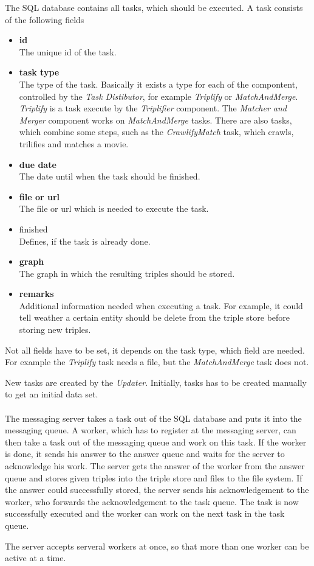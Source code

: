The SQL database contains all tasks, which should be executed.
A task consists of the following fields
\begin{itemize}
  \item \textbf{id} \\
  The unique id of the task.
  \item \textbf{task type} \\
  The type of the task.
  Basically it exists a type for each of the compontent, controlled by the \textit{Task Distibutor}, for example \textit{Triplify} or \textit{MatchAndMerge}.
  \textit{Triplify} is a task execute by the \textit{Triplifier} component.
  The \textit{Matcher and Merger} component works on \textit{MatchAndMerge} tasks.
  There are also tasks, which combine some steps, such as the \textit{CrawlifyMatch} task, which crawls, trilifies and matches a movie.
  \item \textbf{due date} \\
  The date until when the task should be finished.
  \item \textbf{file or url} \\
  The file or url which is needed to execute the task.
  \item finished \\
  Defines, if the task is already done.
  \item \textbf{graph} \\
  The graph in which the resulting triples should be stored.
  \item \textbf{remarks} \\
  Additional information needed when executing a task.
  For example, it could tell weather a certain entity should be delete from the triple store before storing new triples.
\end{itemize}
Not all fields have to be set, it depends on the task type, which field are needed.
For example the \textit{Triplify} task needs a file, but the \textit{MatchAndMerge} task does not.

New tasks are created by the \textit{Updater}.
Initially, tasks has to be created manually to get an initial data set.
\\ \\
The messaging server takes a task out of the SQL database and puts it into the messaging queue.
A worker, which has to register at the messaging server, can then take a task out of the messaging queue and work on this task.
If the worker is done, it sends his answer to the answer queue and waits for the server to acknowledge his work.
The server gets the answer of the worker from the answer queue and stores given triples into the triple store and files to the file system.
If the answer could successfully stored, the server sends his acknowledgement to the worker, who forwards the acknowledgement to the task queue.
The task is now successfully executed and the worker can work on the next task in the task queue.

The server accepts serveral workers at once, so that more than one worker can be active at a time.